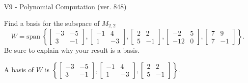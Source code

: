 \begin{exercise}
  \begin{exerciseTitle}V9 - Polynomial Computation (ver. 848)\end{exerciseTitle}
  \begin{exerciseStatement}
    Find a basis for the subspace of \(M_{2,2}\) 
\[W=\mathrm{span}\ \left\{\left[\begin{array}{cc}
-3 & -5 \\
3 & -1
\end{array}\right] , \left[\begin{array}{cc}
-1 & 4 \\
1 & -3
\end{array}\right] , \left[\begin{array}{cc}
2 & 2 \\
5 & -1
\end{array}\right] , \left[\begin{array}{cc}
-2 & 5 \\
-12 & 0
\end{array}\right] , \left[\begin{array}{cc}
7 & 9 \\
7 & -1
\end{array}\right]\right\}.\]
 Be sure to explain why your result is a basis.


  \end{exerciseStatement}
  \begin{exerciseAnswer}
   A basis of \(W\) is  \(\left\{\left[\begin{array}{cc}
-3 & -5 \\
3 & -1
\end{array}\right] , \left[\begin{array}{cc}
-1 & 4 \\
1 & -3
\end{array}\right] , \left[\begin{array}{cc}
2 & 2 \\
5 & -1
\end{array}\right]\right\}\).
  


  \end{exerciseAnswer}
\end{exercise}